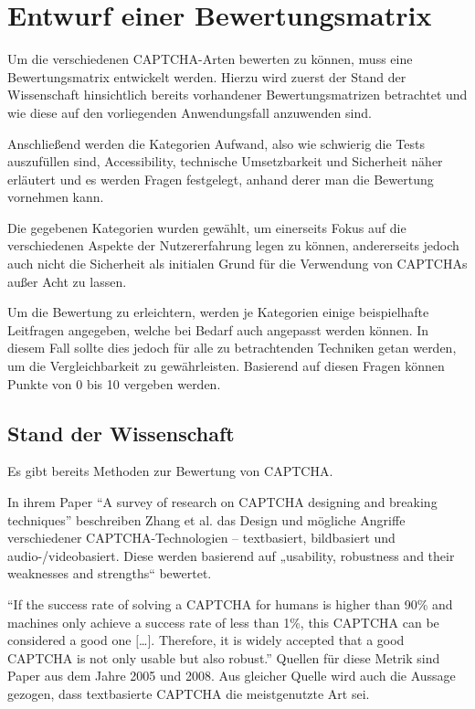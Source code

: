 \chapter{Entwurf einer Bewertungsmatrix}
\label{ch:matrix}

Um die verschiedenen CAPTCHA-Arten bewerten zu können, muss eine Bewertungsmatrix entwickelt werden. 
Hierzu wird zuerst der Stand der Wissenschaft hinsichtlich bereits vorhandener Bewertungsmatrizen betrachtet 
und wie diese auf den vorliegenden Anwendungsfall anzuwenden sind. 

Anschließend werden die Kategorien Aufwand, also wie schwierig die Tests auszufüllen sind, Accessibility, technische Umsetzbarkeit 
und Sicherheit näher erläutert und es werden Fragen festgelegt, anhand derer man die Bewertung vornehmen kann.

Die gegebenen Kategorien wurden gewählt, um einerseits Fokus auf die verschiedenen Aspekte der Nutzererfahrung legen zu können,
andererseits jedoch auch nicht die Sicherheit als initialen Grund für die Verwendung von CAPTCHAs außer Acht zu lassen.

Um die Bewertung zu erleichtern, werden je Kategorien einige beispielhafte Leitfragen angegeben, welche bei Bedarf auch angepasst werden können.
In diesem Fall sollte dies jedoch für alle zu betrachtenden Techniken getan werden, um die Vergleichbarkeit zu gewährleisten.
Basierend auf diesen Fragen können Punkte von 0 bis 10 vergeben werden. 

\section{Stand der Wissenschaft}
\label{ch:matrix:sdw}

Es gibt bereits Methoden zur Bewertung von CAPTCHA.

In ihrem Paper ``A survey of research on CAPTCHA designing and breaking techniques'' beschreiben Zhang et al. das Design 
und mögliche Angriffe verschiedener CAPTCHA-Technologien – textbasiert, bildbasiert und audio-/videobasiert. 
Diese werden basierend auf „usability, robustness and their weaknesses and strengths“ bewertet. %

``If the success rate of solving a CAPTCHA for humans is higher than 90\% and machines only achieve 
a success rate of less than 1\%, this CAPTCHA can be considered a good one $[$\dots$]$. 
Therefore, it is widely accepted that a good CAPTCHA is not only usable but also robust.'' %
Quellen für diese Metrik sind Paper aus dem Jahre 2005 und 2008. 
Aus gleicher Quelle wird auch die Aussage gezogen, dass textbasierte CAPTCHA die meistgenutzte Art sei. 

